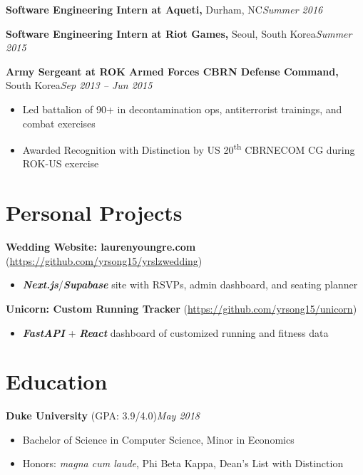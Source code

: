 \documentclass[11pt,letterpaper]{article}
\newcommand{\entry}[3]{\textbf{#1}#2\hfill\textit{#3}\par}
\newcommand{\entryurl}[3]{\textbf{#1} {\scriptsize(\url{#2})}\hfill\textit{#3}\par}
\newcommand{\kw}[1]{\textbf{\textit{#1}}}
\newcommand{\entrysep}{\vspace{6pt}}
\begin{document}
\entrysep
\entry{Software Engineering Intern at Aqueti,}{ Durham, NC}{Summer 2016}
\entrysep
\entry{Software Engineering Intern at Riot Games,}{ Seoul, South Korea}{Summer 2015}
\entrysep
\entry{Army Sergeant at ROK Armed Forces CBRN Defense Command,}{ South Korea}{Sep 2013 -- Jun 2015}
\begin{itemize}
  \item Led battalion of 90+ in decontamination ops, antiterrorist trainings, and combat exercises
  \item Awarded Recognition with Distinction by US 20\textsuperscript{th} CBRNECOM CG during ROK-US exercise
\end{itemize}

\section*{Personal Projects}
\entryurl{Wedding Website: laurenyoungre.com}{https://github.com/yrsong15/yrslzwedding}{}
\begin{itemize}
  \item \kw{Next.js}/\kw{Supabase} site with RSVPs, admin dashboard, and seating planner
\end{itemize}
\entrysep
\entryurl{Unicorn: Custom Running Tracker}{https://github.com/yrsong15/unicorn}{}
\begin{itemize}
  \item \kw{FastAPI} + \kw{React} dashboard of customized running and fitness data
\end{itemize}

\section*{Education}
\entry{Duke University }{(GPA: 3.9/4.0)}{May 2018}
\begin{itemize}
  \item Bachelor of Science in Computer Science, Minor in Economics
  \item Honors: \textit{magna cum laude}, Phi Beta Kappa, Dean's List with Distinction
\end{itemize}
\end{document}
